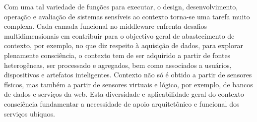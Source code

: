 \documentclass[12pt]{article} %
\begin{document}

Com uma tal variedade de funções para executar, o design, desenvolvimento, operação e avaliação de sistemas sensíveis ao contexto torna-se uma tarefa muito complexa. Cada camada funcional no middleware enfrenta desafios multidimensionais em contribuir para o objectivo geral de abastecimento de contexto, por exemplo, no que diz respeito à aquisição de dados, para explorar plenamente consciência, o contexto tem de ser adquirido a partir de fontes heterogêneas, ser processado e agregados, bem como associados a usuários, dispositivos e artefatos inteligentes. Contexto não só é obtido a partir de sensores físicos, mas também a partir de sensores virtuais e lógico, por exemplo, de bancos de dados e serviços da web. Esta diversidade e aplicabilidade geral do contexto consciência fundamentar a necessidade de apoio arquitetônico e funcional dos serviços ubíquos.

\end{document}
